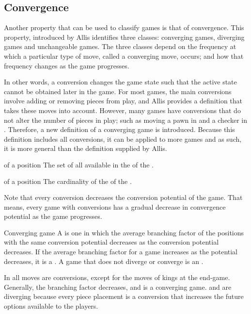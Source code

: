 \subsection{Convergence}
\label{sec:games:convergence}
Another property that can be used to classify games is that of convergence.  This property, introduced by Allis \cite{allis:which} identifies three classes:  converging games, diverging games and unchangeable games. The three classes depend on the frequency at which a particular type of move, called a converging move, occurs; and how that frequency changes as the game progresses.  


In other words, a conversion changes the game state such that the active state cannot be obtained later in the game. For most games, the main conversions involve adding or removing pieces from play, and Allis \cite{allis:which} provides a definition that takes these moves into account.  However, many games have conversions that do not alter the number of pieces in play; such as moving a pawn in  and a checker in .  Therefore, a new definition of a converging game is introduced. Because this definition includes all conversions, it can be applied to more games and as such, it is more general than the definition supplied by Allis.

 {of a position} {The set of all  available in the  of the .}
 
 {of a position} {The cardinality of the  of the .}

\iamhere %

Note that every conversion decreases the conversion potential of the game. That means, every game with conversions has a gradual decrease in convergence potential as the game progresses.  

\begin{definition} {Converging game}
A  is one in which the average branching factor of the positions with the same conversion potential decreases as the conversion potential decreases.  If the average branching factor for a game increases as the potential decreases, it is a . A game that does not diverge or converge is an .
\end{definition}
In  all moves are conversions, except for the moves of kings at the end-game.  Generally, the branching factor decreases, and  is a converging game.  and  are diverging because every piece placement is a conversion that increases the future options available to the players. 

